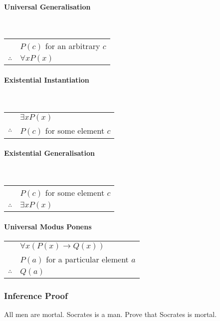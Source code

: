\documentclass[a4paper, 10pt]{article}
\begin{document}
\begin{multicols}{3}
\paragraph{Universal Generalisation}\mbox{}\\
\begin{tabular}{c@{\,}l@{}}
                & \(P(c)\) for an arbitrary \(c\) \\\cline{2-2}
\(\therefore\)  & \(\forall xP(x)\)
\end{tabular}

\paragraph{Existential Instantiation}\mbox{}\\
\begin{tabular}{c@{\,}l@{}}
                & \(\exists xP(x)\) \\\cline{2-2}
\(\therefore\)  & \(P(c)\) for some element \(c\)
\end{tabular}

\paragraph{Existential Generalisation}\mbox{}\\
\begin{tabular}{c@{\,}l@{}}
                & \(P(c)\) for some element \(c\) \\\cline{2-2}
\(\therefore\)  & \(\exists xP(x)\)
\end{tabular}

\paragraph{Universal Modus Ponens}
\begin{tabular}{c@{\,}l@{}}
                & \(\forall x(P(x)\rightarrow Q(x))\) \\
                & \(P(a)\) for a particular element \(a\) \\\cline{2-2}
\(\therefore\)  & \(Q(a)\)
\end{tabular}

\end{multicols}

\subsubsection{Inference Proof}
All men are mortal. Socrates is a man. Prove that Socrates is mortal.
\end{document}
